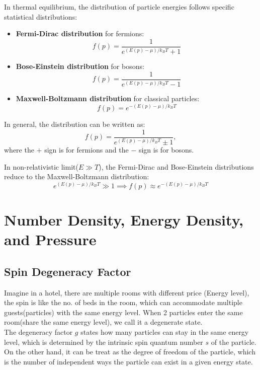 \clearpage
\begin{theory}
  In thermal equilibrium, the distribution of particle energies follows specific statistical distributions:
  \begin{itemize}
    \item \textbf{Fermi-Dirac distribution} for fermions:
    \[
      f(p) = \frac{1}{e^{(E(p)-\mu)/k_B T} + 1}
    \]
    \item \textbf{Bose-Einstein distribution} for bosons:
    \[
      f(p) = \frac{1}{e^{(E(p)-\mu)/k_B T} - 1}
    \]
    \item \textbf{Maxwell-Boltzmann distribution} for classical particles:
    \[
      f(p) = e^{-(E(p)-\mu)/k_B T}
    \]
    \end{itemize}

  In general, the distribution can be written as:
    \[
        f(p) = \frac{1}{e^{(E(p)-\mu)/k_B T} \pm 1},
    \]
  where the $+$ sign is for fermions and the $-$ sign is for bosons.
\end{theory}

\bigskip\noindent
\begin{theory}
    In non-relativistic limit($ E \gg T $), the Fermi-Dirac and Bose-Einstein distributions reduce to the Maxwell-Boltzmann distribution:
    \[
        e^{(E(p) - \mu)/k_B T} \gg 1 \implies f(p) \approx e^{-(E(p)-\mu)/k_B T}
    \]
\end{theory}

\clearpage
\section{Number Density, Energy Density, and Pressure}
\subsection{Spin Degeneracy Factor}
\begin{intuition}
    Imagine in a hotel, there are multiple rooms with different price (Energy level), the spin is like the no. of beds in the room, which can accommodate multiple guests(particles) with the same energy level. 
    When 2 particles enter the same room(share the same energy level), we call it a degenerate state. \\

    The degeneracy factor $g$ states how many particles can stay in the same energy level, which is determined by the intrinsic spin quantum number $s$ of the particle. 
    On the other hand, it can be treat as the degree of freedom of the particle, which is the number of independent ways the particle can exist in a given energy state.
\end{intuition}

